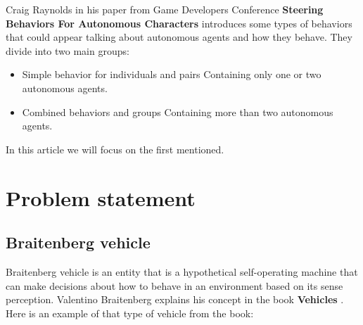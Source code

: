 \documentclass[10pt,twoside,english,a4paper]{article}
\begin{document}
Craig Raynolds in his paper from Game Developers Conference \textbf{Steering Behaviors For Autonomous Characters} \cite{Raynolds} introduces some types of behaviors that could appear talking about autonomous agents and how they behave. They divide into two main groups:

\begin{itemize}
\item Simple behavior for individuals and pairs\newline
Containing only one or two autonomous agents.

\item Combined behaviors and groups\newline
Containing more than two autonomous agents.

\end{itemize}

In this article we will focus on the first mentioned. 

\section{Problem statement} \label{problem}

\subsection{Braitenberg vehicle} \label{braitenberg}

Braitenberg vehicle is an entity that is a hypothetical self-operating machine that can make decisions about how to behave in an environment based on its sense perception. Valentino Braitenberg explains his concept in the book \textbf{Vehicles} \cite{Braitenberg}. Here is an example of that type of vehicle from the book:

\bigbreak
\end{document}
